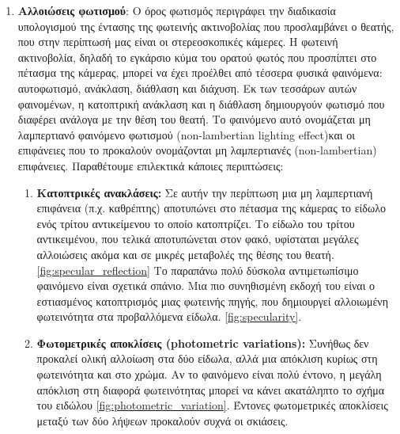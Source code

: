 \begin{enumerate}[label=\textbf{\arabic*.}, ref={\arabic*}]
	\item \label{prop:photometric_variations}\textbf{Αλλοιώσεις φωτισμού}: Ο όρος φωτισμός περιγράφει την διαδικασία υπολογισμού της έντασης της φωτεινής ακτινοβολίας που προσλαμβάνει ο θεατής, που στην περίπτωσή μας είναι οι στερεοσκοπικές κάμερες. Η φωτεινή ακτινοβολία, δηλαδή το εγκάρσιο κύμα του ορατού φωτός που προσπίπτει στο πέτασμα της κάμερας, μπορεί να έχει προέλθει από τέσσερα φυσικά φαινόμενα: αυτοφωτισμό, ανάκλαση, διάθλαση και διάχυση. Εκ των τεσσάρων αυτών φαινομένων, η κατοπτρική ανάκλαση και η διάθλαση δημιουργούν φωτισμό που διαφέρει ανάλογα με την θέση του θεατή. Το φαινόμενο αυτό ονομάζεται μη λαμπερτιανό φαινόμενο φωτισμού \e(non-lambertian lighting effect)\g και οι επιφάνειες που το προκαλούν ονομάζονται μη λαμπερτιανές \e(non-lambertian) \g επιφάνειες. Παραθέτουμε επιλεκτικά κάποιες περιπτώσεις:
	\begin{enumerate}
		\item \textbf{Κατοπτρικές ανακλάσεις:} Σε αυτήν την περίπτωση μια μη λαμπερτιανή επιφάνεια (π.χ. καθρέπτης) αποτυπώνει στο πέτασμα της κάμερας το είδωλο ενός τρίτου αντικείμενου το οποίο κατοπτρίζει. Το είδωλο του τρίτου αντικειμένου, που τελικά αποτυπώνεται στον φακό, υφίσταται μεγάλες αλλοιώσεις ακόμα και σε μικρές μεταβολές της θέσης του θεατή. \ref{fig:specular_reflection}
Το παραπάνω πολύ δύσκολα αντιμετωπίσιμο φαινόμενο είναι σχετικά σπάνιο. Μια πιο συνηθισμένη εκδοχή του είναι ο εστιασμένος κατοπτρισμός μιας φωτεινής πηγής, που δημιουργεί αλλοιωμένη φωτεινότητα στα προβαλλόμενα είδωλα. \ref{fig:specularity}.
		\item \textbf{Φωτομετρικές αποκλίσεις \e(photometric variations): \g} Συνήθως δεν προκαλεί ολική αλλοίωση στα δύο είδωλα, αλλά μια απόκλιση κυρίως στη φωτεινότητα και στο χρώμα. Αν το φαινόμενο είναι πολύ έντονο, η μεγάλη απόκλιση στη διαφορά φωτεινότητας μπορεί να κάνει ακατάληπτο το σχήμα του ειδώλου \ref{fig:photometric_variation}. Έντονες φωτομετρικές αποκλίσεις μεταξύ των δύο λήψεων προκαλούν συχνά οι σκιάσεις.
	\end{enumerate}
\end{enumerate}

